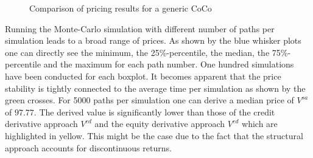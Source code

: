 \begin{figure}[H]
\caption[Comparison of pricing results for a generic CoCo]{Comparison of pricing results for a generic CoCo}
\label{fig:comparison}
\end{figure}

Running the Monte-Carlo simulation with different number of paths per simulation leads to a broad range of prices. As shown by the blue whisker plots one can directly see the minimum, the 25\%-percentile, the median, the 75\%-percentile and the maximum for each path number. One hundred simulations have been conducted for each boxplot. It becomes apparent that the price stability is tightly connected to the average time per simulation as shown by the green crosses. For 5000 paths per simulation one can derive a median price of $V^{sa}$ of $97.77$. The derived value is significantly lower than those of the credit derivative approach $V^{cd}$ and the equity derivative approach $V^{ed}$ which are highlighted in yellow. This might be the case due to the fact that the structural approach accounts for discontinuous returns.


